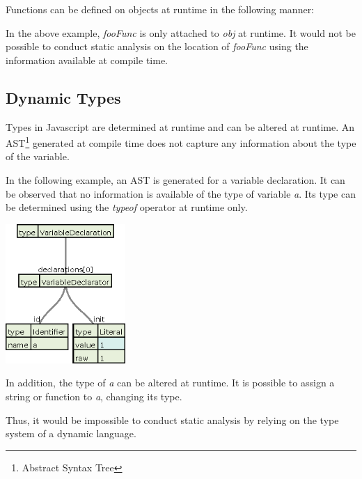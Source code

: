 Functions can be defined on objects at runtime in the following manner:



In the above example, \textit{fooFunc} is only attached to \textit{obj} at runtime. It would not be possible to conduct static analysis on the location of \textit{fooFunc} using the information available at compile time.

\subsection{Dynamic Types}

Types in Javascript are determined at runtime and can be altered at runtime. An AST\footnote{Abstract Syntax Tree} generated at compile time does not capture any information about the type of the variable.

In the following example, an AST is generated for a variable declaration. It can be observed that no information is available of the type of variable \textit{a}. Its type can be determined using the \textit{typeof} operator at runtime only.



\begin{center}
    \includegraphics[height=150pt]{./images/var_decl.eps}
\end{center}

In addition, the type of \textit{a} can be altered at runtime. It is possible to assign a string or function to \textit{a}, changing its type.



Thus, it would be impossible to conduct static analysis by relying on the type system of a dynamic language.
